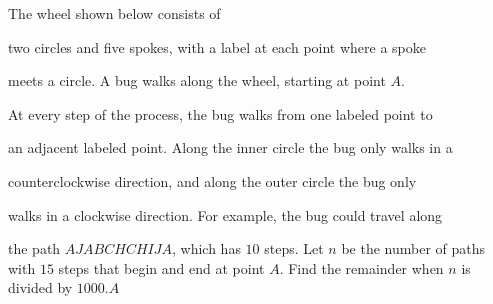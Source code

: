 The wheel shown below consists of

 two circles and five spokes, with a label at each point where a spoke 

meets a circle. A bug walks along the wheel, starting at point \(A\).

 At every step of the process, the bug walks from one labeled point to 

an adjacent labeled point. Along the inner circle the bug only walks in a

 counterclockwise direction, and along the outer circle the bug only 

walks in a clockwise direction. For example, the bug could travel along 

the path \(AJABCHCHIJA\),  which has \(10\) steps. Let \(n\) be the number of paths with \(15\) steps that begin and end at point \(A\). Find the remainder when \(n\) is divided by \(1000\).$A$